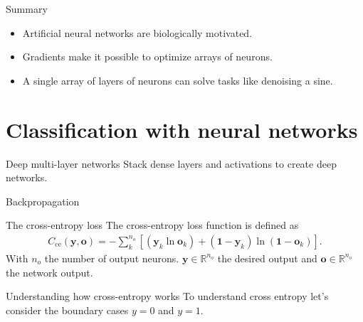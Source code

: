 \documentclass{beamer}
\begin{document}
    \begin{frame}{Summary}
      \begin{itemize}
        \item Artificial neural networks are biologically motivated.
        \item Gradients make it possible to optimize arrays of neurons.
        \item A single array of layers of neurons can solve tasks like denoising a sine.
      \end{itemize}
    \end{frame}


    \section{Classification with neural networks}

    \begin{frame}{Deep multi-layer networks}
      Stack dense layers and activations to create deep networks. \\
      \begin{figure}
         
      \end{figure}
    \end{frame}

    \begin{frame}{Backpropagation}
      \begin{figure}
         
      \end{figure}
    \end{frame}

    \begin{frame}{The cross-entropy loss}
      The cross-entropy loss function is defined as \cite{nielsen2015neural, bishop2006pattern}
      \begin{align} \label{eq:ce}
       C_{\text{ce}}(\mathbf{y}, \mathbf{o}) = -\sum_k^{n_o} [( \mathbf{y}_k  \ln \mathbf{o}_k) 
                                  + (\mathbf{1} - \mathbf{y}_k)
                                     \ln(\mathbf{1} - \mathbf{o}_k)].
      \end{align}
      With $n_o$ the number of output neurons. $\mathbf{y} \in \mathbb{R}^{n_o}$ the desired output and
      $\mathbf{o} \in \mathbb{R}^{n_o}$ the network output.
    \end{frame}

    \begin{frame}{Understanding how cross-entropy works}
      To understand cross entropy let's consider the boundary cases $y=0$ and $y=1$.
      \begin{figure}
        
        
      \end{figure}
    \end{frame}
\end{document}
